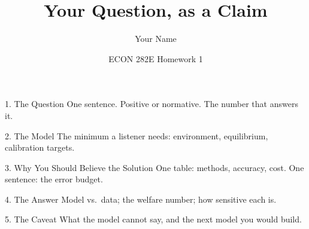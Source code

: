 \documentclass[aspectratio=169,11pt]{beamer}
\title{Your Question, as a Claim}
\author{Your Name}
\date{ECON 282E \quad Homework 1}
\begin{document}
\begin{frame}\titlepage\end{frame}

\begin{frame}{1. The Question}
One sentence. Positive or normative. The number that answers it.
\end{frame}

\begin{frame}{2. The Model}
The minimum a listener needs: environment, equilibrium, calibration targets.
\end{frame}

\begin{frame}{3. Why You Should Believe the Solution}
One table: methods, accuracy, cost. One sentence: the error budget.
\end{frame}

\begin{frame}{4. The Answer}
Model vs.\ data; the welfare number; how sensitive each is.
\end{frame}

\begin{frame}{5. The Caveat}
What the model cannot say, and the next model you would build.
\end{frame}
\end{document}
